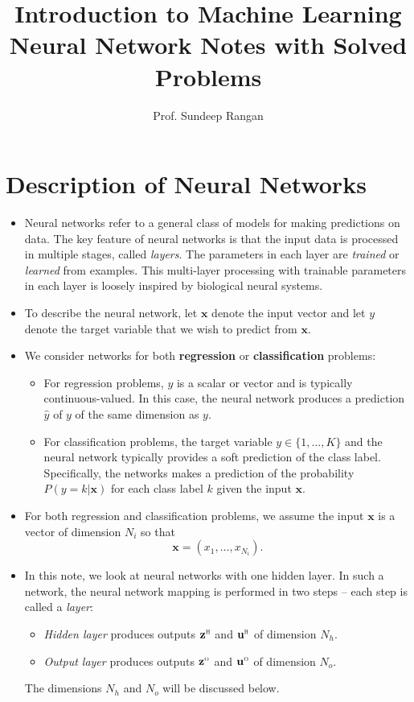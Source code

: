\documentclass[11pt]{article}
\newcommand{\ubf}{\mathbf{u}}
\newcommand{\xbf}{\mathbf{x}}
\newcommand{\zbf}{\mathbf{z}}
\def\hid{\textsc{\tiny H}}
\def\out{\textsc{\tiny O}}
\begin{document}
\title{Introduction to Machine Learning\\
Neural Network Notes with Solved Problems}
\author{Prof. Sundeep Rangan}
\date{}

\maketitle

\section{Description of Neural Networks}
\begin{itemize}
\item Neural networks refer to a general class of models for making predictions on 
data.  The key feature of neural networks is that the input data is processed in 
multiple stages, called \emph{layers}.  The parameters in each layer are \emph{trained}
or \emph{learned} from examples.  This multi-layer processing 
with trainable parameters in each layer is loosely inspired by biological neural systems.
\item To describe the neural network, let $\xbf$ denote the input vector and
let $y$ denote the target variable that we wish to predict from $\xbf$.
\item We consider networks for both \textbf{regression} or \textbf{classification} problems:
\begin{itemize}
\item For regression problems, $y$ is a scalar or vector and is typically continuous-valued.
In this case, the neural network produces a prediction $\hat{y}$ of $y$ of the same dimension as $y$.
\item For classification problems, the target variable $y \in \{1,\ldots,K\}$ and the neural network
typically provides a soft prediction of the class label.
Specifically, the networks makes a prediction of the probability $P(y=k|\xbf)$ for each class label $k$
given the input $\xbf$.
\end{itemize}
\item For both regression and classification problems,
we assume the input $\xbf$ is a vector of dimension $N_i$ so that
\[
    \xbf = (x_1,\ldots,x_{N_i}).
\]

\item In this note, we look at neural networks with one hidden layer.
In such a network, the neural network mapping is performed in two steps -- each step is called a \emph{layer}:
\begin{itemize}
\item \emph{Hidden layer} produces outputs $\zbf^\hid$ and $\ubf^\hid$ of dimension $N_h$.
\item \emph{Output layer} produces outputs $\zbf^\out$ and $\ubf^\out$ of dimension $N_o$.
\end{itemize}
The dimensions $N_h$ and $N_o$ will be discussed below.


\end{itemize}
\end{document}
